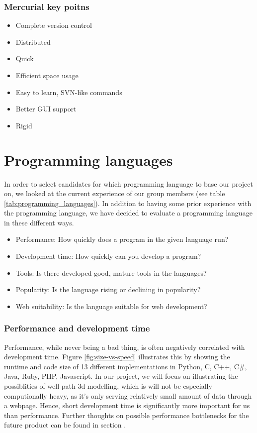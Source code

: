 \documentclass{report}
\begin{document}
\subsubsection{Mercurial key poitns}

\begin{itemize}
\item Complete version control
\item Distributed
\item Quick 
\item Efficient space usage 
\item Easy to learn, SVN-like commands
\item Better GUI support
\item Rigid 
\end{itemize}

\newpage
\section{Programming languages}
In order to select candidates for which programming language to base our project on, we looked at the current experience of our group members (see table \ref{tab:programming_languages}). In addition to having some prior experience with the programming language, we have decided to evaluate a programming language in these different ways. 

\begin{itemize}
\item Performance: How quickly does a program in the given language run? 
\item Development time: How quickly can you develop a program?
\item Tools: Is there developed good, mature tools in the languages?
\item Popularity: Is the language rising or declining in popularity? 
\item Web suitability: Is the language suitable for web development?
\end{itemize}

\subsubsection{Performance and development time}
Performance, while never being a bad thing, is often negatively correlated with development time\cite{website:programming_speed}. Figure \ref{fig:size-vs-speed} illustrates this by showing the runtime and code size of 13 different implementations in Python, C, C++, C\#, Java, Ruby, PHP, Javascript. In our project, we will focus on illustrating the possiblities of well path 3d modelling, which is will not be especially computionally heavy, as it's only serving relatively small amount of data through a webpage. Hence, short development time is significantly more important for us than performance. Further thoughts on possible performance bottlenecks for the future product can be found in section  \label{sec:further_dev}.
\end{document}

